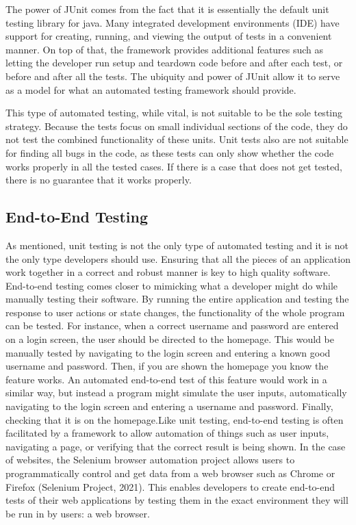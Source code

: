 \documentclass{article}
\begin{document}
\begin{onehalfspacing}
The power of JUnit comes from the fact that it is essentially the
default unit testing library for java. Many integrated development
environments (IDE) have support for creating, running, and viewing the
output of tests in a convenient manner. On top of that, the framework
provides additional features such as letting the developer run setup and
teardown code before and after each test, or before and after all the
tests. The ubiquity and power of JUnit allow it to serve as a model for
what an automated testing framework should provide.

This type of automated testing, while vital, is not suitable to be the
sole testing strategy. Because the tests focus on small individual
sections of the code, they do not test the combined functionality of
these units. Unit tests also are not suitable for finding all bugs in
the code, as these tests can only show whether the code works properly
in all the tested cases. If there is a case that does not get tested,
there is no guarantee that it works properly.

\subsection{End-to-End Testing}

As mentioned, unit testing is not the only type of automated testing and
it is not the only type developers should use. Ensuring that all the
pieces of an application work together in a correct and robust manner is
key to high quality software. End-to-end testing comes closer to
mimicking what a developer might do while manually testing their
software. By running the entire application and testing the response to
user actions or state changes, the functionality of the whole program
can be tested. For instance, when a correct username and password are
entered on a login screen, the user should be directed to the homepage.
This would be manually tested by navigating to the login screen and
entering a known good username and password. Then, if you are shown the
homepage you know the feature works. An automated end-to-end test of
this feature would work in a similar way, but instead a program might
simulate the user inputs, automatically navigating to the login screen
and entering a username and password. Finally, checking that it is on
the homepage.Like unit testing, end-to-end testing is often facilitated
by a framework to allow automation of things such as user inputs,
navigating a page, or verifying that the correct result is being shown.
In the case of websites, the Selenium browser automation project allows
users to programmatically control and get data from a web browser such
as Chrome or Firefox (Selenium Project, 2021). This enables developers
to create end-to-end tests of their web applications by testing them in
the exact environment they will be run in by users: a web browser.


\end{onehalfspacing}
\end{document}
